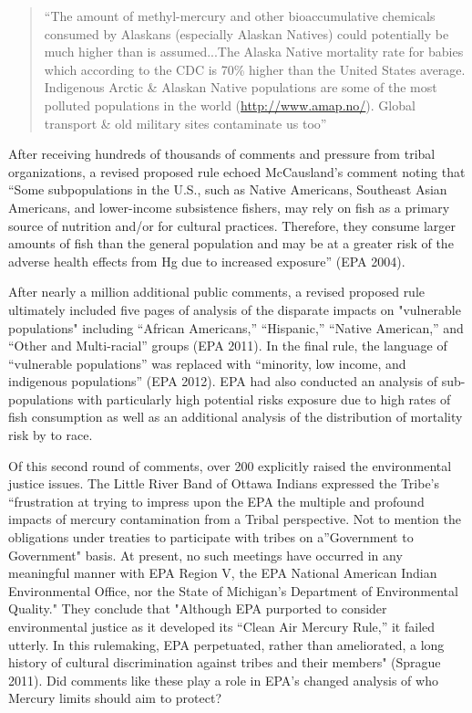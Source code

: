 \documentclass[
      12pt,
        ]{article}
\begin{document}
\begin{quote}
``The amount of methyl-mercury and other bioaccumulative chemicals
consumed by Alaskans (especially Alaskan Natives) could potentially be
much higher than is assumed...The Alaska Native mortality rate for
babies which according to the CDC is 70\% higher than the United States
average. Indigenous Arctic \& Alaskan Native populations are some of
the most polluted populations in the world (\url{http://www.amap.no/}).
Global transport \& old military sites contaminate us too''
\end{quote}

After receiving hundreds of thousands of comments and pressure from
tribal organizations, a revised proposed rule echoed McCausland's
comment noting that ``Some subpopulations in the U.S., such as Native
Americans, Southeast Asian Americans, and lower-income subsistence
fishers, may rely on fish as a primary source of nutrition and/or for
cultural practices. Therefore, they consume larger amounts of fish than
the general population and may be at a greater risk of the adverse
health effects from Hg due to increased exposure'' (EPA 2004).

After nearly a million additional public comments, a revised proposed
rule ultimately included five pages of analysis of the disparate impacts
on "vulnerable populations" including ``African Americans,'' ``Hispanic,''
``Native American,'' and ``Other and Multi-racial'' groups (EPA 2011). In
the final rule, the language of ``vulnerable populations'' was replaced
with ``minority, low income, and indigenous populations'' (EPA 2012). EPA
had also conducted an analysis of sub-populations with particularly high
potential risks exposure due to high rates of fish consumption as well
as an additional analysis of the distribution of mortality risk by to
race.

Of this second round of comments, over 200 explicitly raised the
environmental justice issues. The Little River Band of Ottawa Indians
expressed the Tribe's ``frustration at trying to impress upon the EPA the
multiple and profound impacts of mercury contamination from a Tribal
perspective. Not to mention the obligations under treaties to
participate with tribes on a''Government to Government" basis. At
present, no such meetings have occurred in any meaningful manner with
EPA Region V, the EPA National American Indian Environmental Office, nor
the State of Michigan's Department of Environmental Quality." They
conclude that "Although EPA purported to consider environmental justice
as it developed its ``Clean Air Mercury Rule,'' it failed utterly. In this
rulemaking, EPA perpetuated, rather than ameliorated, a long history of
cultural discrimination against tribes and their members" (Sprague
2011). Did comments like these play a role in EPA's changed analysis of
who Mercury limits should aim to protect?
\end{document}
